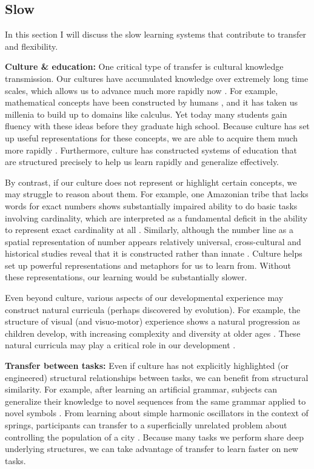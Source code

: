 \subsection{Slow}
In this section I will discuss the slow learning systems that contribute to transfer and flexibility. \par
\textbf{Culture \& education:} One critical type of transfer is cultural knowledge transmission. Our cultures have accumulated knowledge over extremely long time scales, which allows us to advance much more rapidly now \citep{Tomasello1993, Bengio2012}. For example, mathematical concepts have been constructed by humans \citep{Hersh1997, MacLane1986}, and it has taken us millenia to build up to domains like calculus. Yet today many students gain fluency with these ideas before they graduate high school. Because culture has set up useful representations for these concepts, we are able to acquire them much more rapidly \citep[e.g.][]{McClelland2016}. Furthermore, culture has constructed systems of education that are structured precisely to help us learn rapidly and generalize effectively. \par 
By contrast, if our culture does not represent or highlight certain concepts, we may struggle to reason about them. For example, one Amazonian tribe that lacks words for exact numbers shows substantially impaired ability to do basic tasks involving cardinality, which are interpreted as a fundamental deficit in the ability to represent exact cardinality at all \citep{Gordon2004}. Similarly, although the number line as a spatial representation of number appears relatively universal, cross-cultural and historical studies reveal that it is constructed rather than innate \citep{Nunez2011}. Culture helps set up powerful representations and metaphors for us to learn from. Without these representations, our learning would be substantially slower. \par 
Even beyond culture, various aspects of our developmental experience may construct natural curricula (perhaps discovered by evolution). For example, the structure of visual (and visuo-motor) experience shows a natural progression as children develop, with increasing complexity and diversity at older ages \citep{Fausey2016}. These natural curricula may play a critical role in our development \citep{Smith2017}.\par 
\textbf{Transfer between tasks:} Even if culture has not explicitly highlighted (or engineered) structural relationships between tasks, we can benefit from structural similarity. For example, after learning an artificial grammar, subjects can generalize their knowledge to novel sequences from the same grammar applied to novel symbols \citep[e.g.][]{Tunney2001}. From learning about simple harmonic oscillators in the context of springs, participants can transfer to a superficially unrelated problem about controlling the population of a city \citep[e.g.][]{Day2011}. Because many tasks we perform share deep underlying structures, we can take advantage of transfer to learn faster on new tasks. \par 

